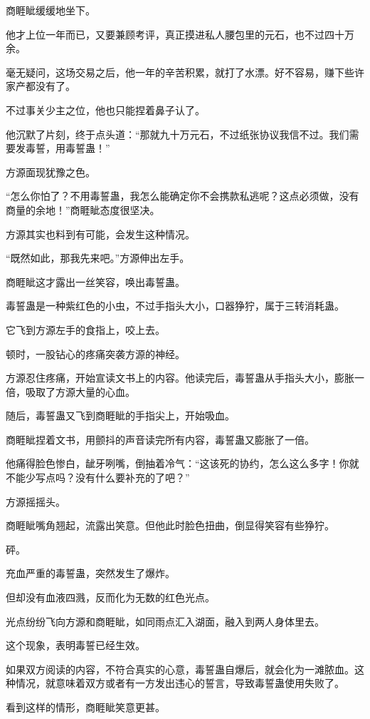 \begin{this_body}
商睚眦缓缓地坐下。

他才上位一年而已，又要兼顾考评，真正摸进私人腰包里的元石，也不过四十万余。

毫无疑问，这场交易之后，他一年的辛苦积累，就打了水漂。好不容易，赚下些许家产都没有了。

不过事关少主之位，他也只能捏着鼻子认了。

他沉默了片刻，终于点头道：“那就九十万元石，不过纸张协议我信不过。我们需要发毒誓，用毒誓蛊！”

方源面现犹豫之色。

“怎么你怕了？不用毒誓蛊，我怎么能确定你不会携款私逃呢？这点必须做，没有商量的余地！”商睚眦态度很坚决。

方源其实也料到有可能，会发生这种情况。

“既然如此，那我先来吧。”方源伸出左手。

商睚眦这才露出一丝笑容，唤出毒誓蛊。

毒誓蛊是一种紫红色的小虫，不过手指头大小，口器狰狞，属于三转消耗蛊。

它飞到方源左手的食指上，咬上去。

顿时，一股钻心的疼痛突袭方源的神经。

方源忍住疼痛，开始宣读文书上的内容。他读完后，毒誓蛊从手指头大小，膨胀一倍，吸取了方源大量的心血。

随后，毒誓蛊又飞到商睚眦的手指尖上，开始吸血。

商睚眦捏着文书，用颤抖的声音读完所有内容，毒誓蛊又膨胀了一倍。

他痛得脸色惨白，龇牙咧嘴，倒抽着冷气：“这该死的协约，怎么这么多字！你就不能少写点吗？没有什么要补充的了吧？”

方源摇摇头。

商睚眦嘴角翘起，流露出笑意。但他此时脸色扭曲，倒显得笑容有些狰狞。

砰。

充血严重的毒誓蛊，突然发生了爆炸。

但却没有血液四溅，反而化为无数的红色光点。

光点纷纷飞向方源和商睚眦，如同雨点汇入湖面，融入到两人身体里去。

这个现象，表明毒誓已经生效。

如果双方阅读的内容，不符合真实的心意，毒誓蛊自爆后，就会化为一滩脓血。这种情况，就意味着双方或者有一方发出违心的誓言，导致毒誓蛊使用失败了。

看到这样的情形，商睚眦笑意更甚。


\end{this_body}
